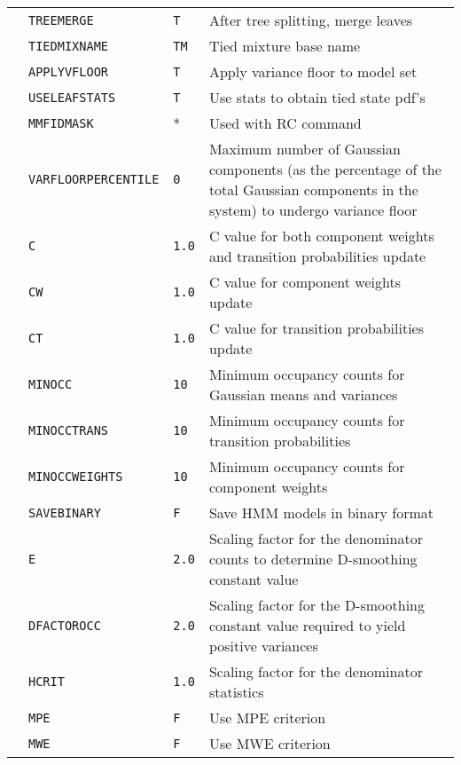 \begin{center}
\begin{supertabular}{|p{1.4cm}|l|l|p{6.6cm}|}
 & \texttt{TREEMERGE} & \texttt{T} & After tree splitting, merge leaves \\ 
  & \texttt{TIEDMIXNAME} & \texttt{TM} & Tied mixture base name \\ 
  & \texttt{APPLYVFLOOR} & \texttt{T} & Apply variance floor to model set \\  
  & \texttt{USELEAFSTATS} & \texttt{T} & Use stats to obtain tied state pdf's \\ 
  & \texttt{MMFIDMASK} & * & Used with RC  command \\
 \hline

& \texttt{VARFLOORPERCENTILE} & \texttt{0} & Maximum number of Gaussian components (as the percentage of the total Gaussian components in the system) to undergo variance floor \\ 
& \texttt{C} & \texttt{1.0} & C value for both component weights and transition probabilities update \\ 
& \texttt{CW} & \texttt{1.0} & C value for component weights update\\ 
& \texttt{CT} & \texttt{1.0} & C value for transition probabilities update\\ 
& \texttt{MINOCC} & \texttt{10} & Minimum occupancy counts for Gaussian means and variances \\ 
& \texttt{MINOCCTRANS} & \texttt{10} & Minimum occupancy counts for transition probabilities \\ 
& \texttt{MINOCCWEIGHTS} & \texttt{10} & Minimum occupancy counts for component weights \\ 
& \texttt{SAVEBINARY} & \texttt{F} & Save HMM models in binary format \\ 
& \texttt{E} & \texttt{2.0} & Scaling factor for the denominator counts to determine D-smoothing constant value \\ 
& \texttt{DFACTOROCC} & \texttt{2.0} & Scaling factor for the D-smoothing constant value required to yield positive variances \\ 
& \texttt{HCRIT} & \texttt{1.0} & Scaling factor for the denominator statistics \\ 
& \texttt{MPE} & \texttt{F} & Use MPE criterion \\ 
& \texttt{MWE} & \texttt{F} & Use MWE criterion \\ 

\end{supertabular}
\end{center}
